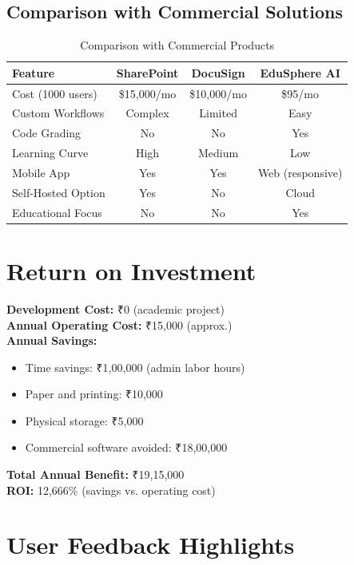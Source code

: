 \subsection{Comparison with Commercial Solutions}

\begin{table}[H]
\centering
\small
\begin{tabular}{|l|c|c|c|}
\hline
\textbf{Feature} & \textbf{SharePoint} & \textbf{DocuSign} & \textbf{EduSphere AI} \\
\hline
Cost (1000 users) & \$15,000/mo & \$10,000/mo & \$95/mo \\
Custom Workflows & Complex & Limited & Easy \\
Code Grading & No & No & Yes \\
Learning Curve & High & Medium & Low \\
Mobile App & Yes & Yes & Web (responsive) \\
Self-Hosted Option & Yes & No & Cloud \\
Educational Focus & No & No & Yes \\
\hline
\end{tabular}
\caption{Comparison with Commercial Products}
\end{table}

\section{Return on Investment}

\textbf{Development Cost:} ₹0 (academic project)\\
\textbf{Annual Operating Cost:} ₹15,000 (approx.)\\
\textbf{Annual Savings:}
\begin{itemize}
\item Time savings: ₹1,00,000 (admin labor hours)
\item Paper and printing: ₹10,000
\item Physical storage: ₹5,000
\item Commercial software avoided: ₹18,00,000
\end{itemize}

\textbf{Total Annual Benefit:} ₹19,15,000\\
\textbf{ROI:} 12,666\% (savings vs. operating cost)

\section{User Feedback Highlights}

